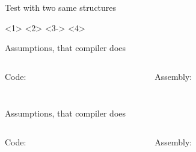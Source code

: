 \documentclass{panicsoftware-presentation}
\begin{document}
\begin{frame}{Test with two same structures}

<1>
<2>
<3->
\vfill
{}<4>

\end{frame}

\begin{frame}{Assumptions, that compiler does}

\begin{columns}[t]

\begin{column}{0.58\linewidth}


\centerline{Code:}

\vfill

\inputminted[firstline=9, highlightlines={9}]{\myCpp}{examples/TBAA-simple-example.cpp}

\end{column}


\begin{column}{0.28\linewidth}

\centerline{Assembly:}

\vfill

\centering\inputminted[highlightlines={6}]{gas}{examples/TBAA-simple-example.asm}

\end{column}

\end{columns}

\end{frame}

\begin{frame}{Assumptions, that compiler does}

\begin{columns}[t]

\begin{column}{0.58\linewidth}


\centerline{Code:}

\vfill

\inputminted[firstline=5, highlightlines=5]{\myCpp}{examples/Non-TBAA-simple-example.cpp}

\end{column}


\begin{column}{0.28\linewidth}

\centerline{Assembly:}

\vfill

\centering\inputminted[highlightlines={6,7}]{gas}{examples/Non-TBAA-simple-asembly.asm}

\end{column}

\end{columns}

\end{frame}
\end{document}
